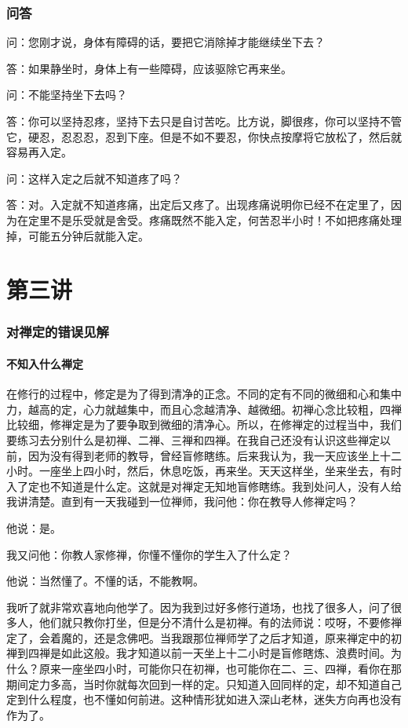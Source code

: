 \documentclass{book}
\begin{document}
\subsection{问答}

问：您刚才说，身体有障碍的话，要把它消除掉才能继续坐下去？

答：如果静坐时，身体上有一些障碍，应该驱除它再来坐。

问：不能坚持坐下去吗？

答：你可以坚持忍疼，坚持下去只是自讨苦吃。比方说，脚很疼，你可以坚持不管它，硬忍，忍忍忍，忍到下座。但是不如不要忍，你快点按摩将它放松了，然后就容易再入定。

问：这样入定之后就不知道疼了吗？

答：对。入定就不知道疼痛，出定后又疼了。出现疼痛说明你已经不在定里了，因为在定里不是乐受就是舍受。疼痛既然不能入定，何苦忍半小时！不如把疼痛处理掉，可能五分钟后就能入定。

\chapter{第三讲}

\subsection{对禅定的错误见解}

\subsubsection{不知入什么禅定}

在修行的过程中，修定是为了得到清净的正念。不同的定有不同的微细和心和集中力，越高的定，心力就越集中，而且心念越清净、越微细。初禅心念比较粗，四禅比较细，修禅定是为了要争取到微细的清净心。所以，在修禅定的过程当中，我们要练习去分别什么是初禅、二禅、三禅和四禅。在我自己还没有认识这些禅定以前，因为没有得到老师的教导，曾经盲修瞎练。后来我认为，我一天应该坐上十二小时。一座坐上四小时，然后，休息吃饭，再来坐。天天这样坐，坐来坐去，有时入了定也不知道是什么定。这就是对禅定无知地盲修瞎练。我到处问人，没有人给我讲清楚。直到有一天我碰到一位禅师，我问他：你在教导人修禅定吗？

他说：是。

我又问他：你教人家修禅，你懂不懂你的学生入了什么定？

他说：当然懂了。不懂的话，不能教啊。

我听了就非常欢喜地向他学了。因为我到过好多修行道场，也找了很多人，问了很多人，他们就只教你打坐，但是分不清什么是初禅。有的法师说：哎呀，不要修禅定了，会着魔的，还是念佛吧。当我跟那位禅师学了之后才知道，原来禅定中的初禅到四禅是如此这般。我才知道以前一天坐上十二小时是盲修瞎炼、浪费时间。为什么？原来一座坐四小时，可能你只在初禅，也可能你在二、三、四禅，看你在那期间定力多高，当时你就每次回到一样的定。只知道入回同样的定，却不知道自己定到什么程度，也不懂如何前进。这种情形犹如进入深山老林，迷失方向再也没有作为了。
\end{document}
